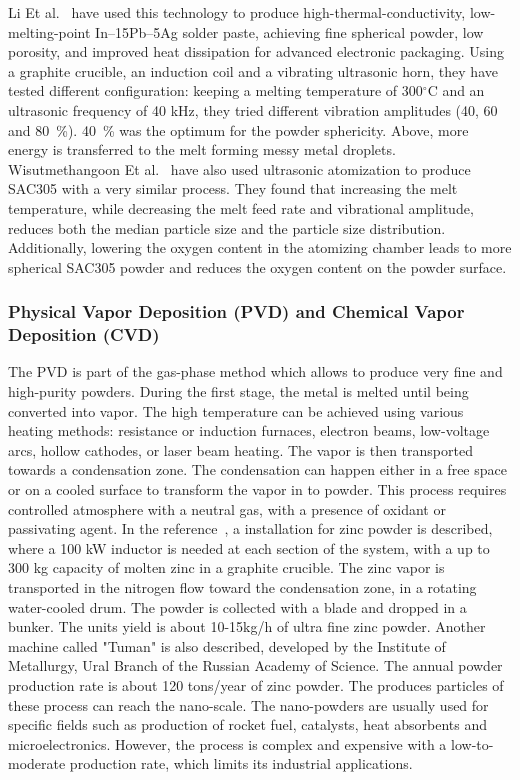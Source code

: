 \documentclass[../main]{subfiles}
\begin{document}
Li Et al.~\cite{Li202515Pb5Ag} have used this technology to produce high-thermal-conductivity, low-melting-point In–15Pb–5Ag solder paste, achieving fine spherical powder, low porosity, and improved heat dissipation for advanced electronic packaging. Using a graphite crucible, an induction coil and a vibrating ultrasonic horn, they have tested different configuration: keeping a melting temperature of 300$^{\circ}$C and an ultrasonic frequency of 40 kHz, they tried different vibration amplitudes (40, 60 and 80~\%). 40~\% was the optimum for the powder sphericity. Above, more energy is transferred to the melt forming messy metal droplets. Wisutmethangoon Et al.~\cite{Wisutmethangoon2011ProductionSAC305} have also used ultrasonic atomization to produce SAC305 with a very similar process. They found that increasing the melt temperature, while decreasing the melt feed rate and vibrational amplitude, reduces both the median particle size and the particle size distribution. Additionally, lowering the oxygen content in the atomizing chamber leads to more spherical SAC305 powder and reduces the oxygen content on the powder surface.


\subsubsection{Physical Vapor Deposition (PVD) and Chemical Vapor Deposition (CVD)}

The PVD is part of the gas-phase method which allows to produce very fine and high-purity powders. During the first stage, the metal is melted until being converted into vapor. The high temperature can be achieved using various heating methods:  resistance or induction furnaces, electron beams, low-voltage arcs, hollow cathodes, or laser beam heating. The vapor is then transported towards  a condensation zone. The condensation can happen either in a free space or on a cooled surface to transform the vapor in to powder. This process requires controlled atmosphere with a neutral gas, with a presence of oxidant or passivating agent. In the reference~\cite{Neikov2009HandbookNonFerrous}, a installation for zinc powder is described, where a 100 kW inductor is needed at each section of the system, with a up to 300 kg capacity of molten zinc in a graphite crucible. The zinc vapor is transported in the nitrogen flow toward the condensation zone, in a rotating water-cooled drum. The powder is collected with a blade and dropped in a bunker. The units yield is about 10-15kg/h of ultra fine zinc powder.
Another machine called "Tuman" is also described, developed by the Institute of Metallurgy, Ural Branch of the Russian Academy of Science. The annual powder production rate is about 120 tons/year of zinc powder. The produces particles of these process can reach the nano-scale. The nano-powders are usually used for specific fields such as production of rocket fuel, catalysts, heat absorbents and microelectronics. However, the process is complex and expensive with a low-to-moderate production rate, which limits its industrial applications.\\
\end{document}
